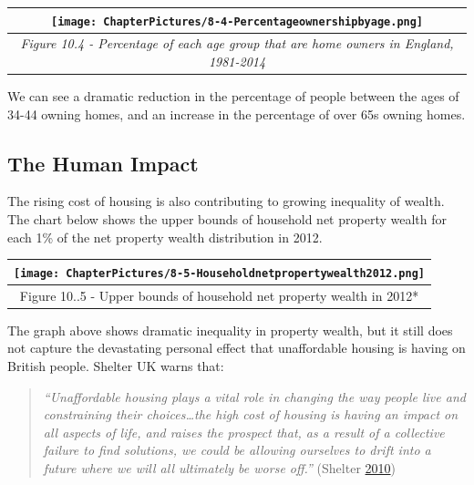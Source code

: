 \documentclass[]{tufte-handout}
\begin{document}
\begin{longtable}[]{@{}c@{}}
\toprule
\begin{minipage}[b]{0.97\columnwidth}\centering
\texttt{[image: ChapterPictures/8-4-Percentageownershipbyage.png]}\strut
\end{minipage}\tabularnewline
\midrule
\endhead
\begin{minipage}[t]{0.97\columnwidth}\centering
\emph{Figure 10.4 - Percentage of each age group that are home owners in
England, 1981-2014}\strut
\end{minipage}\tabularnewline
\bottomrule
\end{longtable}

We can see a dramatic reduction in the percentage of people between the
ages of 34-44 owning homes, and an increase in the percentage of over
65s owning homes.

\hypertarget{the-human-impact}{%
\subsection{The Human Impact}\label{the-human-impact}}

The rising cost of housing is also contributing to growing inequality of
wealth. The chart below shows the upper bounds of household net property
wealth for each 1\% of the net property wealth distribution in 2012.

\begin{longtable}[]{@{}c@{}}
\toprule
\texttt{[image: ChapterPictures/8-5-Householdnetpropertywealth2012.png]}\tabularnewline
\midrule
\endhead
Figure 10..5 - Upper bounds of household net property wealth in
2012*\tabularnewline
\bottomrule
\end{longtable}

The graph above shows dramatic inequality in property wealth, but it
still does not capture the devastating personal effect that unaffordable
housing is having on British people. Shelter UK warns that:

\begin{quote}
\emph{``Unaffordable housing plays a vital role in changing the way
people live and constraining their choices\ldots{}the high cost of
housing is having an impact on all aspects of life, and raises the
prospect that, as a result of a collective failure to find solutions, we
could be allowing ourselves to drift into a future where we will all
ultimately be worse off.''} (Shelter
\protect\hyperlink{ref-Shelter2010}{2010})
\end{quote}
\end{document}
